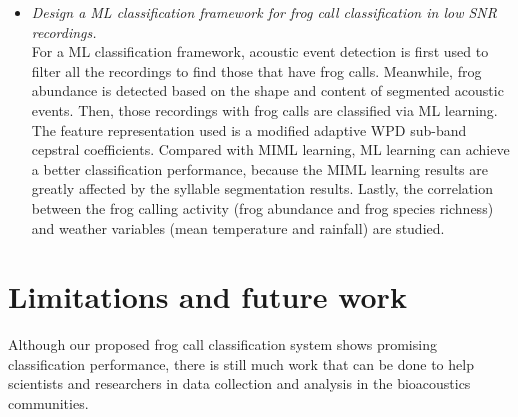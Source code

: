 \begin{itemize}
\item  \textit{Design a ML classification framework for frog call classification in low SNR recordings.} 
\\
For a ML classification framework, acoustic event detection is first used to filter all the recordings to find those that have frog calls. Meanwhile, frog abundance is detected based on the shape and content of segmented acoustic events. Then, those recordings with frog calls are classified via ML learning. The feature representation used is a modified adaptive WPD sub-band cepstral coefficients. Compared with MIML learning, ML learning can achieve a better classification performance, because the MIML learning results are greatly affected by the syllable segmentation results. Lastly, the correlation between the frog calling activity (frog abundance and frog species richness) and weather variables (mean temperature and rainfall) are studied.

\end{itemize}

%
%

\section{Limitations and future work}
Although our proposed frog call classification system shows promising classification performance, there is still much work that can be done to help scientists and researchers in data collection and analysis in the bioacoustics communities.


